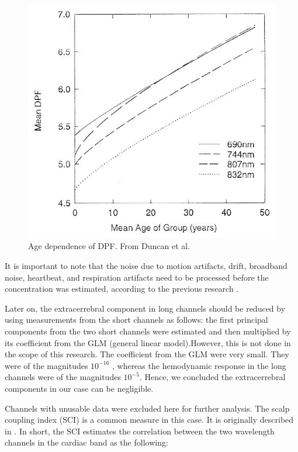 \begin{figure}[H]
  \centering
    \includegraphics[scale=.45]{bilder/fig3_duncan.jpg}
  \caption{Age dependence of DPF. From Duncan et al.}
  \label{fig:somesignal}
\end{figure}

It is important to note that the noise due to motion artifacts, drift, broadband noise, heartbeat, and respiration artifacts need to be processed before the concentration was estimated, according to the previous research \cite {Huppert:09}.

Later on, the extracerrebral component in long channels should be reduced by using measurements from the short channels as follows: the first principal components from the two short channels were estimated and then multiplied by its coefficient from the GLM (general linear model).However, this is not done in the scope of this research. The coefficient from the GLM were very small. They were of the magnitudes $10^{-16}$ , whereas the hemodynamic response in the long channels were of the magnitudes $10^{-5}$. Hence, we concluded the extracerrebral components in our case can be negligible.

Channels with unusable data were excluded here for further analysis. The scalp coupling index (SCI) is a common measure in this case. It is originally described in \cite {polloniniSCI}. In short, the SCI estimates the correlation between the two wavelength channels in the cardiac band as the following:

